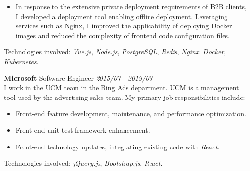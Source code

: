 \documentclass[a4paper]{article}
\newenvironment{changemargin}[2]{%
  \begin{list}{}{%
    \setlength{\topsep}{0pt}%
    \setlength{\leftmargin}{#1}%
    \setlength{\rightmargin}{#2}%
    \setlength{\listparindent}{\parindent}%
    \setlength{\itemindent}{\parindent}%
    \setlength{\parsep}{\parskip}%
  }%
  \item[]}{\end{list}
}
\newenvironment{body} {
	\vspace*{-16pt}
	\begin{changemargin}{-0.5in}{-0.5in}
  }
	{\end{changemargin}
}
\begin{document}
\begin{body}
	\vspace*{-6pt}
	\begin{itemize} \itemsep -0pt  %
		\item In response to the extensive private deployment requirements of B2B clients, I developed a deployment tool enabling offline deployment. Leveraging services such as Nginx, I improved the applicability of deploying Docker images and reduced the complexity of frontend code configuration files.\\
	\end{itemize}
	\vspace*{-6pt}

	\vspace{6pt}
	Technologies involved: \emph{Vue.js}, \emph{Node.js}, \emph{PostgreSQL}, \emph{Redis}, \emph{Nginx}, \emph{Docker}, \emph{Kubernetes}.
	\medskip

	\textbf{Microsoft} \hfill Software Engineer \emph{2015/07 - 2019/03} \\
	\smallskip
	I work in the UCM team in the Bing Ads department. UCM is a management tool used by the advertising sales team. My primary job responsibilities include:
	\begin{itemize} \itemsep -0pt  %
		\item Front-end feature development, maintenance, and performance optimization.\\
	\end{itemize}
	\vspace*{-8pt}
	\begin{itemize} \itemsep -0pt  %
		\item Front-end unit test framework enhancement.\\
	\end{itemize}
	\vspace*{-8pt}
	\begin{itemize} \itemsep -0pt  %
		\item Front-end technology updates, integrating existing code with \emph{React}.\\
	\end{itemize}
	Technologies involved: \emph{jQuery.js}, \emph{Bootstrap.js}, \emph{React}.\\


\end{body}
\end{document}
